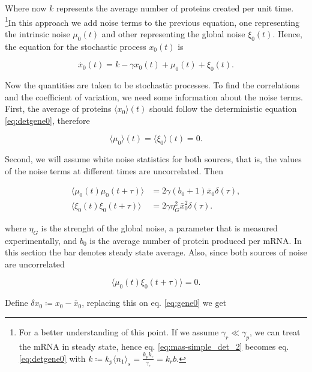 Where now $k$ represents the average number of proteins created per unit time. \footnote{For a better understanding of this point. If we assume $\gamma_r\ll\gamma_p$, we can treat the mRNA in steady state, hence eq. \eqref{eq:mas-simple_det_2} becomes eq. \eqref{eq:detgene0} with $k \coloneqq k_p\langle n_1\rangle_s =  \frac{k_pk_r}{\gamma_r} = k_rb$.}In this approach we add noise terms to the previous equation, one representing the intrinsic noise $\mu_0(t)$ and other representing the global noise $\xi_0(t)$. Hence, the equation for the stochastic process $x_0(t)$ is

\begin{equation}
\label{eq:gene0}
\dot{x_0}(t) = k - \gamma x_0(t) + \mu_0(t) + \xi_0(t).
\end{equation}

Now the quantities are taken to be stochastic processes. To find the correlations and the coefficient of variation, we need some information about the noise terms. First, the average of proteins $\langle x_0 \rangle (t)$ should follow the deterministic equation \eqref{eq:detgene0}, therefore

\begin{equation*}
\langle\mu_0\rangle(t) = \langle\xi_0\rangle(t) = 0.
\end{equation*}

Second, we will assume white noise statistics for both sources, that is, the values of the noise terms at different times are uncorrelated. Then

\begin{align}
\langle\mu_0(t)\mu_0(t+\tau)\rangle&=2\gamma(b_0+1)\bar{x}_0\delta(\tau),\label{eq:corin0}\\
\langle\xi_0(t)\xi_0(t+\tau)\rangle&=2\gamma\eta_G^2\bar{x}_0^2\delta(\tau). \label{eq:corex0}
\end{align}


where $\eta_G$ is the strenght of the global noise, a parameter that is measured experimentally, and $b_0$ is the average number of protein produced per mRNA. In this section the bar denotes steady state average. Also, since both sources of noise are uncorrelated

\begin{equation}
\label{eq:corinex0}
\langle\mu_0(t)\xi_0(t+\tau)\rangle = 0.
\end{equation}

Define $\delta x_0 \coloneqq x_0 - \bar{x}_0$, replacing this on eq. \eqref{eq:gene0} we get

